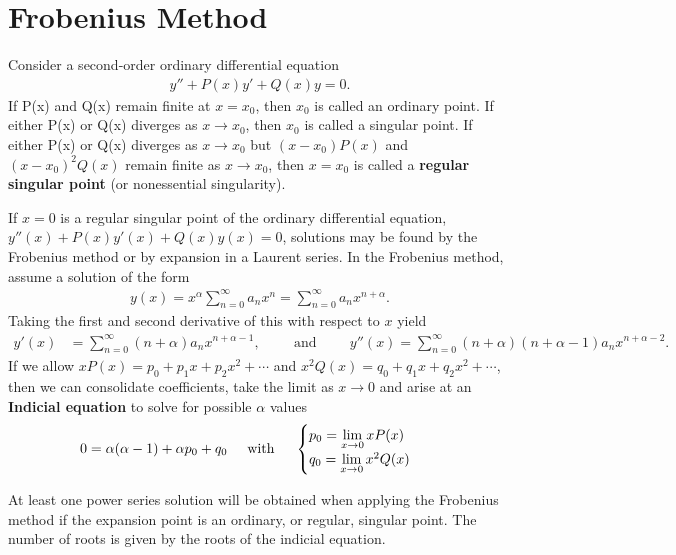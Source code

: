 \newpage
\section{Frobenius Method}
Consider a second-order ordinary differential equation
\begin{align}
 	y''+P(x)y'+Q(x)y=0.
\end{align}
If P(x) and Q(x) remain finite at $x=x_0$, then $x_0$ is called an ordinary point. If either P(x) or Q(x) diverges as $x\rightarrow x_0$, then $x_0$ is called a singular point. If either P(x) or Q(x) diverges as $x\rightarrow x_0$ but $(x-x_0)P(x)$ and $(x-x_0)^2Q(x)$ remain finite as $x\rightarrow x_0$, then $x=x_0$ is called a \textbf{regular singular point} (or nonessential singularity)\cite{bib:Wolfram}. 
\begin{center}
	\noindent\makebox[\linewidth]{\rule{\textwidth}{0.4pt}}
\end{center}
If $x=0$ is a regular singular point of the ordinary differential equation, $y''(x)+P(x)y'(x)+Q(x)y(x)=0$, solutions may be found by the Frobenius method or by expansion in a Laurent series. In the Frobenius method, assume a solution of the form 
\begin{align}
	y(x) = x^\alpha \sum_{n=0}^{\infty}a_n x^n = \sum_{n=0}^{\infty}a_n x^{n+\alpha}.
\end{align}
Taking the first and second derivative of this with respect to $x$ yield
\begin{align}
	y'(x) &= \sum_{n=0}^{\infty}(n+\alpha)a_n x^{n+\alpha-1}, \hspace{1cm}\textrm{and}\hspace{1cm}
	y''(x) = \sum_{n=0}^{\infty}(n+\alpha)(n+\alpha-1)a_n x^{n+\alpha-2}.
\end{align}
If we allow $xP(x) = p_0+p_1x+p_2x^2+\cdots$ and $x^2Q(x) = q_0+q_1x+q_2x^2+\cdots$, then we can consolidate coefficients, take the limit as $x \rightarrow 0$ and arise at an \textbf{Indicial equation} to solve for possible $\alpha$ values
\begin{align}
	0&=\alpha(\alpha-1)+\alpha p_0+q_0 \hspace{0.5cm}\textrm{with} \hspace{0.5cm}\begin{cases}
	p_0 = \lim\limits_{x \rightarrow 0} xP(x) \\
	q_0 = \lim\limits_{x \rightarrow 0} x^2Q(x)
	\end{cases}
\end{align}
\begin{fancybox}{1}
	At least one power series solution will be obtained when applying the Frobenius method if the expansion point is an ordinary, or regular, singular point. The number of roots is given by the roots of the indicial equation. 
\end{fancybox}

